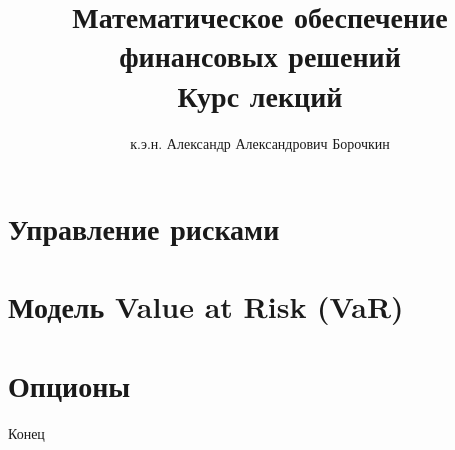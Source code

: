 \documentclass{beamer}
\title[Математическое обеспечение финансовых решений]{Математическое обеспечение финансовых решений\\Курс лекций}
\author{к.э.н. Александр Александрович Борочкин}
\institute{Нижегородский государственный университет}
\date{\the\year}
\begin{document}
\begin{frame}
\titlepage
\end{frame}

%


\section{Управление рисками}


\section{Модель Value at Risk (VaR)}
%


\section{Опционы}


\begin{frame}
\begin{center}
\huge{Конец}
\end{center}
\end{frame}
\end{document}
